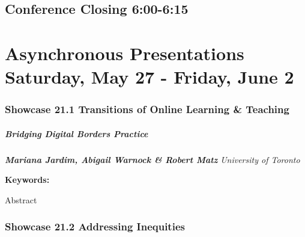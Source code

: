 \documentclass[
]{book}
\begin{document}
\hypertarget{conference-closing-600-615}{%
\section*{Conference Closing \textbar{} 6:00-6:15}\label{conference-closing-600-615}}

\hypertarget{asynchronous-presentations-saturday-may-27---friday-june-2}{%
\chapter*{Asynchronous Presentations \textbar{} Saturday, May 27 - Friday, June 2}\label{asynchronous-presentations-saturday-may-27---friday-june-2}}

\hypertarget{showcase-21.1-transitions-of-online-learning-teaching}{%
\subsection*{Showcase 21.1 \textbar{} Transitions of Online Learning \& Teaching}\label{showcase-21.1-transitions-of-online-learning-teaching}}

\begin{session}
\hypertarget{bridging-digital-borders-practice}{%
\paragraph*{\texorpdfstring{\textbf{Bridging Digital Borders} \textbar{}
Practice}{Bridging Digital Borders \textbar{} Practice}}\label{bridging-digital-borders-practice}}

\textbf{\emph{Mariana Jardim, Abigail Warnock \& Robert Matz}}
\textbar{} \emph{University of Toronto}

\textbf{Keywords:}

Abstract
\end{session}

\hypertarget{showcase-21.2-addressing-inequities}{%
\subsection*{Showcase 21.2 \textbar{} Addressing Inequities}\label{showcase-21.2-addressing-inequities}}
\end{document}
